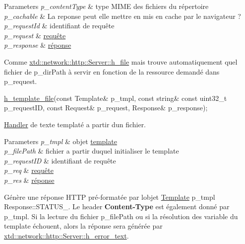 \begin{DoxyItemize}
\begin{DoxyParams}{Parameters}
\hline
{\em p\+\_\+content\+Type} & type M\+I\+ME des fichiers du répertoire \\
\hline
{\em p\+\_\+cachable} & La reponse peut elle mettre en mis en cache par le navigateur ? \\
\hline
{\em p\+\_\+request\+Id} & identifiant de requête \\
\hline
{\em p\+\_\+request} & \hyperlink{classxtd_1_1network_1_1http_1_1Request}{requête} \\
\hline
{\em p\+\_\+response} & \hyperlink{classxtd_1_1network_1_1http_1_1Response}{réponse}\\
\hline
\end{DoxyParams}
Comme \hyperlink{classxtd_1_1network_1_1http_1_1Server_ab3525557fb71fe7ffec9bf68b61db107}{xtd\+::network\+::http\+::\+Server\+::h\+\_\+file} mais trouve automatiquement quel fichier de p\+\_\+dir\+Path à servir en fonction de la ressource demandé dans p\+\_\+request.
\item 
\begin{DoxyCode}
\hyperlink{classxtd_1_1network_1_1http_1_1Server_a96229b97d8ee79a57d1ab66b7af5b32d}{h\_template\_file}(\textcolor{keyword}{const} Template& p\_tmpl, \textcolor{keyword}{const} \textcolor{keywordtype}{string}& \textcolor{keyword}{const} uint32\_t p\_requestID, \textcolor{keyword}{const} 
      Request& p\_request, Response& p\_response); 
\end{DoxyCode}
 \hyperlink{classxtd_1_1network_1_1http_1_1Server_1_1Handler}{Handler} de texte templaté a partir d\textquotesingle{}un fichier. 
\begin{DoxyParams}{Parameters}
{\em p\+\_\+tmpl} & objet \hyperlink{classxtd_1_1network_1_1http_1_1Template}{template} \\
\hline
{\em p\+\_\+file\+Path} & fichier a partir duquel initialiser le template \\
\hline
{\em p\+\_\+request\+ID} & identifiant de requête \\
\hline
{\em p\+\_\+req} & \hyperlink{classxtd_1_1network_1_1http_1_1Request}{requête} \\
\hline
{\em p\+\_\+res} & \hyperlink{classxtd_1_1network_1_1http_1_1Response}{réponse}\\
\hline
\end{DoxyParams}
Génère une réponse H\+T\+TP pré-\/formatée par l\textquotesingle{}objet \hyperlink{classxtd_1_1network_1_1http_1_1Template}{Template} p\+\_\+tmpl Response\+::\+S\+T\+A\+T\+U\+S\+\_. Le header {\bfseries Content-\/\+Type} est également donné par p\+\_\+tmpl. Si la lecture du fichier p\+\_\+file\+Path ou si la résolution des variable du template échouent, alors la réponse sera générée par \hyperlink{classxtd_1_1network_1_1http_1_1Server_ad57a524ff44201af997e2d3557557623}{xtd\+::network\+::http\+::\+Server\+::h\+\_\+error\+\_\+text}.

\end{DoxyItemize}
